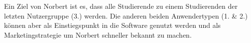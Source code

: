 Ein Ziel von Norbert ist es, dass alle Studierende zu einem Studierenden der letzten Nutzergruppe (3.) werden. Die anderen beiden Anwendertypen (1. \& 2.) können aber als Einstiegspunkt in die Software genutzt werden und als Marketingstrategie um Norbert schneller bekannt zu machen.

%

